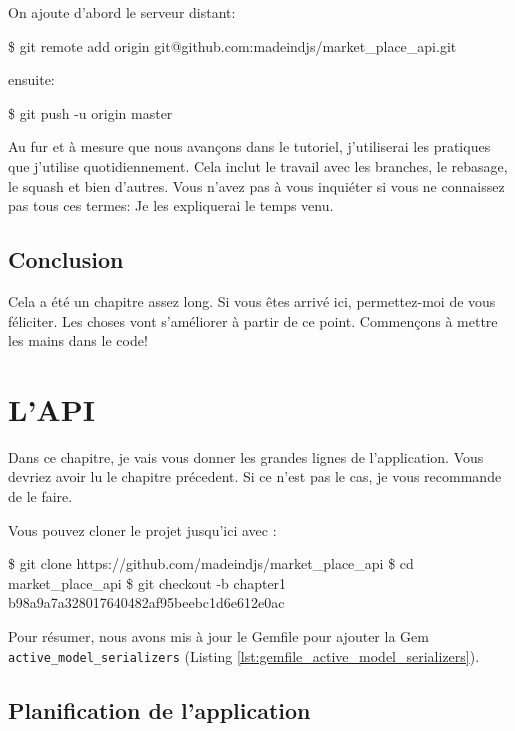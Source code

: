\documentclass[]{report}
\begin{document}
    On ajoute d'abord le serveur distant:

    \begin{bashcode}
    \$ git remote add origin git@github.com:madeindjs/market_place_api.git
    \end{bashcode}

    ensuite:

    \begin{bashcode}
    \$ git push -u origin master
    \end{bashcode}

    Au fur et à mesure que nous avançons dans le tutoriel, j'utiliserai les pratiques que j'utilise quotidiennement. Cela inclut le travail avec les branches, le rebasage, le squash et bien d'autres. Vous n'avez pas à vous inquiéter si vous ne connaissez pas tous ces termes: Je les expliquerai le temps venu.

  \section{Conclusion}

    Cela a été un chapitre assez long. Si vous êtes arrivé ici, permettez-moi de vous féliciter. Les choses vont s'améliorer à partir de ce point. Commençons à mettre les mains dans le code!

\chapter{L'API}\label{chapter:2}

  Dans ce chapitre, je vais vous donner les grandes lignes de l'application. Vous devriez avoir lu le chapitre précedent. Si ce n'est pas le cas, je vous recommande de le faire.

  Vous pouvez cloner le projet jusqu'ici avec :

  \begin{bashcode}
  \$ git clone https://github.com/madeindjs/market_place_api
  \$ cd market_place_api
  \$ git checkout -b chapter1 b98a9a7a328017640482af95beebc1d6e612e0ac
  \end{bashcode}

  Pour résumer, nous avons mis à jour le Gemfile pour ajouter la Gem \verb|active_model_serializers| (Listing \ref{lst:gemfile_active_model_serializers}).

  \section{Planification de l'application}
\end{document}
